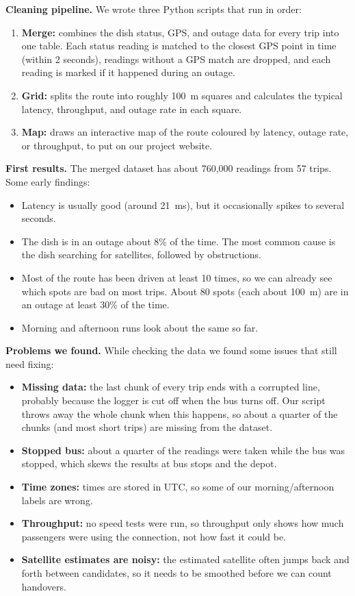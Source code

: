 \documentclass{article}
\begin{document}
\textbf{Cleaning pipeline.} We wrote three Python scripts that run in order:
\begin{enumerate}
    \item \textbf{Merge:} combines the dish status, GPS, and outage data for every trip into one table. Each status reading is matched to the closest GPS point in time (within 2 seconds), readings without a GPS match are dropped, and each reading is marked if it happened during an outage.
    \item \textbf{Grid:} splits the route into roughly 100~m squares and calculates the typical latency, throughput, and outage rate in each square.
    \item \textbf{Map:} draws an interactive map of the route coloured by latency, outage rate, or throughput, to put on our project website.
\end{enumerate}

\textbf{First results.} The merged dataset has about 760,000 readings from 57 trips. Some early findings:
\begin{itemize}
    \item Latency is usually good (around 21~ms), but it occasionally spikes to several seconds.
    \item The dish is in an outage about 8\% of the time. The most common cause is the dish searching for satellites, followed by obstructions.
    \item Most of the route has been driven at least 10 times, so we can already see which spots are bad on most trips. About 80 spots (each about 100~m) are in an outage at least 30\% of the time.
    \item Morning and afternoon runs look about the same so far.
\end{itemize}

\textbf{Problems we found.} While checking the data we found some issues that still need fixing:
\begin{itemize}
    \item \textbf{Missing data:} the last chunk of every trip ends with a corrupted line, probably because the logger is cut off when the bus turns off. Our script throws away the whole chunk when this happens, so about a quarter of the chunks (and most short trips) are missing from the dataset.
    \item \textbf{Stopped bus:} about a quarter of the readings were taken while the bus was stopped, which skews the results at bus stops and the depot.
    \item \textbf{Time zones:} times are stored in UTC, so some of our morning/afternoon labels are wrong.
    \item \textbf{Throughput:} no speed tests were run, so throughput only shows how much passengers were using the connection, not how fast it could be.
    \item \textbf{Satellite estimates are noisy:} the estimated satellite often jumps back and forth between candidates, so it needs to be smoothed before we can count handovers.
\end{itemize}
\end{document}

